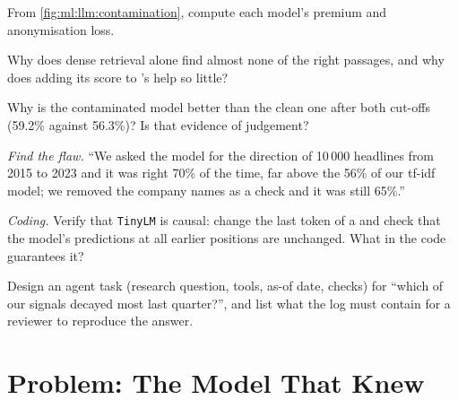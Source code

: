 \begin{exercise}[$\star$]\label{exo:ml:large-language-models-in-finance:3}
From \cref{fig:ml:llm:contamination}, compute each model's  premium and anonymisation loss.
\end{exercise}

\begin{exercise}[$\star\star$]\label{exo:ml:large-language-models-in-finance:4}
Why does dense retrieval alone find almost none of the right passages, and why does adding its score to 's help so
little?
\end{exercise}

\begin{exercise}[$\star\star$]\label{exo:ml:large-language-models-in-finance:5}
Why is the contaminated model better than the clean one after both cut-offs (59.2\% against 56.3\%)? Is that evidence of
judgement?
\end{exercise}

\begin{exercise}[$\star\star$]\label{exo:ml:large-language-models-in-finance:6}
\emph{Find the flaw.} ``We asked the model for the direction of 10\,000 headlines from 2015 to 2023 and it was right 70\% of the
time, far above the 56\% of our tf-idf model; we removed the company names as a check and it was still 65\%.''
\end{exercise}

\begin{exercise}[$\star\star\star$]\label{exo:ml:large-language-models-in-finance:7}
\emph{Coding.} Verify that \texttt{TinyLM} is causal: change the last token of a  and check that the model's
predictions at all earlier positions are unchanged. What in the code guarantees it?
\end{exercise}

\begin{exercise}[$\star\star\star$]\label{exo:ml:large-language-models-in-finance:8}
Design an agent task (research question, tools, as-of date, checks) for ``which of our signals decayed most last quarter?'',
and list what the log must contain for a reviewer to reproduce the answer.
\end{exercise}

\section{Problem: The Model That Knew}

